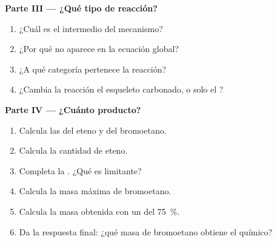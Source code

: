 \begin{problem}
\medskip
\noindent\textbf{Parte III --- ¿Qué tipo de reacción?}
\begin{enumerate}[resume]
  \item ¿Cuál es el intermedio del mecanismo?
  \item ¿Por qué no aparece en la ecuación global?
  \item ¿A qué categoría pertenece la reacción?
  \item ¿Cambia la reacción el esqueleto carbonado, o solo el ?
\end{enumerate}

\medskip
\noindent\textbf{Parte IV --- ¿Cuánto producto?}
\begin{enumerate}[resume]
  \item Calcula las  del eteno y del bromoetano.
  \item Calcula la cantidad de eteno.
  \item Completa la . ¿Qué  es limitante?
  \item Calcula la masa máxima de bromoetano.
  \item Calcula la masa obtenida con un  del \qty{75}{\percent}.
  \item Da la respuesta final: ¿qué masa de bromoetano obtiene el químico?
\end{enumerate}
\end{problem}
